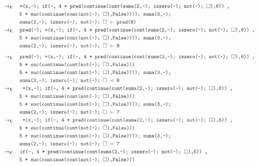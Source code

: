\documentclass{article}
\newcommand{\tx}[1]{\textcolor{Black} {\texttt{#1}}}
\newcommand{\es}{$\square$}
\newcommand{\kr}{\rightarrow_{\mathcal{K}} \quad}
\begin{document}
\begin{enumerate}
\begin{enumerate}
\begin{align*}
			&\kr \tx{=(x,-); if(-, 4 * pred(continue(cont(suma(2,-); iszero(-); not(-); \es),6)) ,}\\
			&\tx {\quad \quad \quad 5 * suc(continue(cont(not(-); \es),False)))); suma(3,-);}\\
			&\tx{\quad \quad \quad suma(2,-); iszero(-); not(-); \es $\ \succ $ pred(8)} \\
			&\kr \tx{pred(-); =(x,-); if(-, 4 * pred(continue(cont(suma(2,-); iszero(-); not(-); \es),6)) ,}\\
			&\tx {\quad \quad \quad 5 * suc(continue(cont(not(-); \es),False)))); suma(3,-);}\\
			&\tx{\quad \quad \quad suma(2,-); iszero(-); not(-); \es $\ \succ $ 8} \\
			\end{align*}
			\begin{align*}
			&\kr \tx{pred(-); =(x,-); if(-, 4 * pred(continue(cont(suma(2,-); iszero(-); not(-); \es),6)) ,}\\
			&\tx{\quad \quad \quad 5 * suc(continue(cont(not(-); \es),False)))}\\
			&\tx {\quad \quad \quad 5 * suc(continue(cont(not(-); \es),False)))); suma(3,-);}\\
			&\tx{\quad \quad \quad suma(2,-); iszero(-); not(-); \es $\ \prec $ 8} \\
			&\kr \tx{ =(x,-); if(-, 4 * pred(continue(cont(suma(2,-); iszero(-); not(-); \es),6)) ,}\\
			&\tx{\quad \quad \quad 5 * suc(continue(cont(not(-); \es),False)))}\\
			&\tx {\quad \quad \quad 5 * suc(continue(cont(not(-); \es),False)))); suma(3,-);}\\
			&\tx{\quad \quad \quad suma(2,-); iszero(-); not(-); \es $\ \succ $ 7} \\
			&\kr \tx{ =(x,-); if(-, 4 * pred(continue(cont(suma(2,-); iszero(-); not(-); \es),6)) ,}\\
			&\tx{\quad \quad \quad 5 * suc(continue(cont(not(-); \es),False)))}\\
			&\tx {\quad \quad \quad 5 * suc(continue(cont(not(-); \es),False)))); suma(3,-);}\\
			&\tx{\quad \quad \quad suma(2,-); iszero(-); not(-); \es $\ \prec $ 7} \\
			&\kr \tx{if(-, 4 * pred(continue(cont(suma(2,-); iszero(-); not(-); \es),6)) ,}\\
			&\tx{\quad \quad \quad 5 * suc(continue(cont(not(-); \es),False)))}\\

\end{align*}
\end{enumerate}
\end{enumerate}
\end{document}
